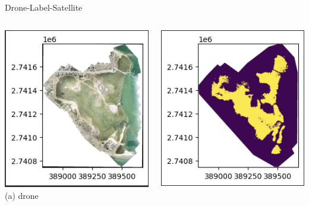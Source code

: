 \begin{frame}{Drone-Label-Satellite}
  \begin{columns}[T]  %
    \begin{column}{0.3\textwidth}
      \centering
      \includegraphics[width=\linewidth,keepaspectratio]{images/mm_drone.png}
      \\
      {\small (a) drone}
    \end{column}
    \begin{column}{0.3\textwidth}
      \centering
      \includegraphics[width=\linewidth,keepaspectratio]{images/mm_label.png}

\end{column}
\end{columns}
\end{frame}
